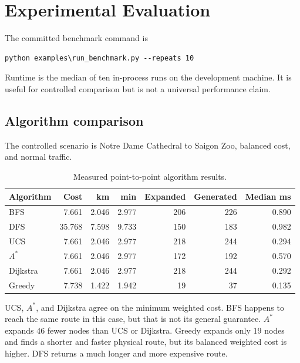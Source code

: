 \documentclass[12pt,a4paper]{article}
\begin{document}
\section{Experimental Evaluation}

The committed benchmark command is

\begin{lstlisting}
python examples\run_benchmark.py --repeats 10
\end{lstlisting}

Runtime is the median of ten in-process runs on the development machine. It is
useful for controlled comparison but is not a universal performance claim.

\subsection{Algorithm comparison}

The controlled scenario is Notre Dame Cathedral to Saigon Zoo, balanced cost,
and normal traffic.

\begin{table}[H]
    \centering
    \caption{Measured point-to-point algorithm results.}
    \label{tab:benchmark}
    \renewcommand{\arraystretch}{1.12}
    \scriptsize
    \begin{tabular}{lrrrrrr}
        \toprule
        \textbf{Algorithm} & \textbf{Cost} & \textbf{km} & \textbf{min} &
        \textbf{Expanded} & \textbf{Generated} & \textbf{Median ms} \\
        \midrule
        BFS & 7.661 & 2.046 & 2.977 & 206 & 226 & 0.890 \\
        DFS & 35.768 & 7.598 & 9.733 & 150 & 183 & 0.982 \\
        UCS & 7.661 & 2.046 & 2.977 & 218 & 244 & 0.294 \\
        $A^*$ & 7.661 & 2.046 & 2.977 & 172 & 192 & 0.570 \\
        Dijkstra & 7.661 & 2.046 & 2.977 & 218 & 244 & 0.292 \\
        Greedy & 7.738 & 1.422 & 1.942 & 19 & 37 & 0.135 \\
        \bottomrule
    \end{tabular}
\end{table}

UCS, $A^*$, and Dijkstra agree on the minimum weighted cost. BFS happens to
reach the same route in this case, but that is not its general guarantee.
$A^*$ expands 46 fewer nodes than UCS or Dijkstra. Greedy expands only 19 nodes
and finds a shorter and faster physical route, but its balanced weighted cost is
higher. DFS returns a much longer and more expensive route.
\end{document}
